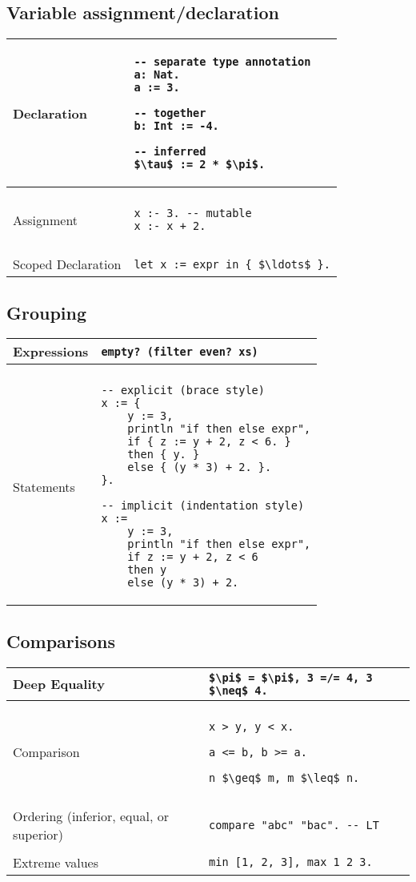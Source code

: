 \documentclass[a4paper,12pt]{article}
\makeatletter
\newcommand{\code}{\lstinline}
\newcommand{\br}{\\ [0.5em] \hline \\ [-0.5em]}
\newenvironment{data}
    {
        \begin{center}
        \begin{tabular*}{\textwidth}{ l@{\extracolsep{\fill}}l }
    }
    {
        \end{tabular*}
        \end{center}
    }
\makeatother
\begin{document}
\subsection{Variable assignment/declaration}
    \begin{data}
        Declaration        & 
            \begin{lstlisting}[mathescape=true]
-- separate type annotation
a: Nat. 
a := 3.

-- together
b: Int := -4. 

-- inferred
$\tau$ := 2 * $\pi$. 
            \end{lstlisting} \br
        Assignment         & 
            \begin{lstlisting}
x :- 3. -- mutable
x :- x + 2. 
            \end{lstlisting} \br
        Scoped Declaration & 
            \code[mathescape=true]|let x := expr in { $\ldots$ }.|
    \end{data}

\subsection{Grouping}
    \begin{data}
        Expressions       & 
            \code|empty? (filter even? xs)| \br
        Statements & 
            \begin{lstlisting}
-- explicit (brace style)
x := { 
    y := 3, 
    println "if then else expr",
    if { z := y + 2, z < 6. }
    then { y. } 
    else { (y * 3) + 2. }.
}.

-- implicit (indentation style)
x :=
    y := 3,
    println "if then else expr",
    if z := y + 2, z < 6 
    then y
    else (y * 3) + 2.
            \end{lstlisting}
    \end{data}

\subsection{Comparisons}
\begin{data}
    Deep Equality  & 
        \code[mathescape=true]
        |$\pi$ = $\pi$, 3 =/= 4, 3 $\neq$ 4.|       \br
    Comparison     &
        \begin{lstlisting}[mathescape=true]
x > y, y < x.

a <= b, b >= a.

n $\geq$ m, m $\leq$ n.
        \end{lstlisting} \br
    Ordering (inferior, equal, or superior) &
        \code|compare "abc" "bac". -- LT|    \br
    Extreme values &
        \code|min [1, 2, 3], max 1 2 3.|
\end{data}
\end{document}
